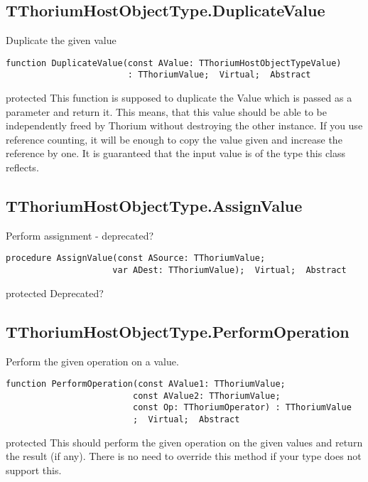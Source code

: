 \subsection{TThoriumHostObjectType.DuplicateValue}
\label{thoriumcorepkg:thorium:tthoriumhostobjecttype:duplicatevalue}
\begin{FPCList}
\Synopsis
Duplicate the given value\Declaration 

\begin{verbatim}
function DuplicateValue(const AValue: TThoriumHostObjectTypeValue)
                        : TThoriumValue;  Virtual;  Abstract
\end{verbatim}
\Visibility
protected
\Description
This function is supposed to duplicate the Value which is passed as a parameter and return it. This means, that this value should be able to be independently freed by Thorium without destroying the other instance. If you use reference counting, it will be enough to copy the value given and increase the reference by one. It is guaranteed that the input value is of the type this class reflects.\end{FPCList}
\subsection{TThoriumHostObjectType.AssignValue}
\label{thoriumcorepkg:thorium:tthoriumhostobjecttype:assignvalue}
\begin{FPCList}
\Synopsis
Perform assignment - deprecated?\Declaration 

\begin{verbatim}
procedure AssignValue(const ASource: TThoriumValue;
                     var ADest: TThoriumValue);  Virtual;  Abstract
\end{verbatim}
\Visibility
protected
\Description
Deprecated?\end{FPCList}
\subsection{TThoriumHostObjectType.PerformOperation}
\label{thoriumcorepkg:thorium:tthoriumhostobjecttype:performoperation}
\begin{FPCList}
\Synopsis
Perform the given operation on a value.\Declaration 

\begin{verbatim}
function PerformOperation(const AValue1: TThoriumValue;
                         const AValue2: TThoriumValue;
                         const Op: TThoriumOperator) : TThoriumValue
                         ;  Virtual;  Abstract
\end{verbatim}
\Visibility
protected
\Description
This should perform the given operation on the given values and return the result (if any). There is no need to override this method if your type does not support this.\end{FPCList}
